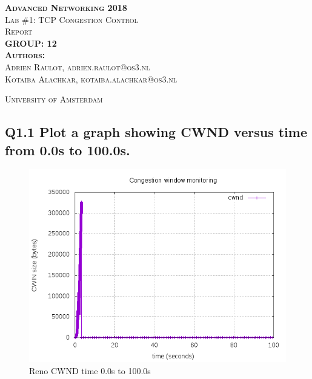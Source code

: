 \documentclass{article}
\begin{document}
\begin{titlepage}
\begin{center}
\textsc{\huge \bfseries Advanced Networking 2018}\\[1.5cm]
\textsc{\large Lab \#1: TCP Congestion Control}\\[1.5cm]
\textsc{\huge Report}\\[1.5cm]
\textsc{\huge \bfseries GROUP: 12}\\[1.5cm]
\textsc{\large{\textbf{Authors:}\\ Adrien Raulot, adrien.raulot@os3.nl\\ Kotaiba Alachkar, kotaiba.alachkar@os3.nl}}

\textsc{\large University of Amsterdam}
\end{center}
\end{titlepage}

\subsection{Q1.1 Plot a graph showing CWND versus time from 0.0s to
100.0s.}

\begin{figure}[H]
\centering
\includegraphics[width=12cm]{figures/cwndReno.png}
\caption{Reno CWND time 0.0s to 100.0s}
\end{figure}
\end{document}
